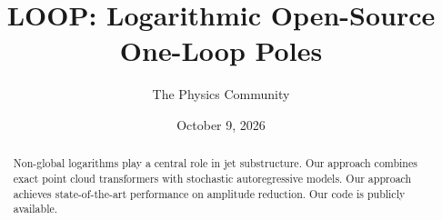 \documentclass[11pt]{article}
\title{LOOP: Logarithmic Open-Source One-Loop Poles}
\author{The Physics Community}
\date{October 9, 2026}
\numberwithin{equation}{section}
\theoremstyle{definition}
\theoremstyle{remark}
\begin{document}
\maketitle
\begin{abstract}
Non-global logarithms play a central role in jet substructure. Our
approach combines exact point cloud transformers with stochastic
autoregressive models. Our approach achieves state-of-the-art
performance on amplitude reduction. Our code is publicly available.
\end{abstract}
\tableofcontents



\nocite{*}


\end{document}
